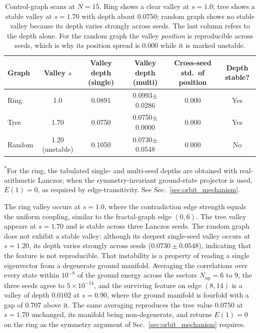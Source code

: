 \documentclass[pdflatex,sn-mathphys-num,iicol]{sn-jnl}
\begin{document}
\begin{table}[t]
\centering
\caption{Control-graph scans at $N=15$. Ring shows a clear valley at $s=1.0$; tree shows a stable valley at $s=1.70$ with depth about $0.0750$; random graph shows no stable valley because its depth varies strongly across seeds. The last column refers to the depth alone. For the random graph the valley \emph{position} is reproducible across seeds, which is why its position spread is $0.000$ while it is marked unstable.}
\label{tab:control_graphs}
\begin{tabular}{lccccc}
\toprule
Graph & Valley $s$ & Valley depth (single) & Valley depth (multi) & Cross-seed std.\ of position & Depth stable? \\
\midrule
Ring & 1.0 & 0.0891 & 0.0993$\pm$0.0286 & 0.000 & Yes \\
Tree & 1.70 & 0.0750 & 0.0750$\pm$0.0000 & 0.000 & Yes \\
Random & 1.20 (unstable) & 0.1050 & 0.0730$\pm$0.0548 & 0.000 & No \\
\bottomrule
\end{tabular}
\end{table}

\noindent\textsuperscript{*}For the ring, the tabulated single- and multi-seed depths are obtained with real-arithmetic Lanczos; when the symmetry-invariant ground-state projector is used, \(E(1)=0\), as required by edge-transitivity. See Sec.~\ref{sec:orbit_mechanism}.

The ring valley occurs at $s=1.0$, where the contradiction edge strength equals the uniform coupling, similar to the fractal-graph edge $(0,6)$. The tree valley appears at $s=1.70$ and is stable across three Lanczos seeds. The random graph does not exhibit a stable valley: although its deepest single-seed valley occurs at $s=1.20$, its depth varies strongly across seeds ($0.0730\pm0.0548$), indicating that the feature is not reproducible. That instability is a property of reading a single eigenvector from a degenerate ground manifold. Averaging the correlations over every state within $10^{-8}$ of the ground energy across the sectors $N_{\text{up}}=6$ to $9$, the three seeds agree to $5\times10^{-14}$, and the surviving feature on edge $(8,14)$ is a valley of depth $0.0102$ at $s=0.90$, where the ground manifold is fourfold with a gap of $0.707$ above it. The same averaging reproduces the tree value $0.0750$ at $s=1.70$ unchanged, its manifold being non-degenerate, and returns $E(1)=0$ on the ring as the symmetry argument of Sec.~\ref{sec:orbit_mechanism} requires.
\end{document}
